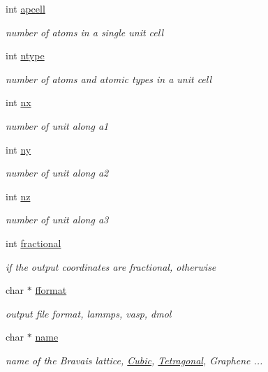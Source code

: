 \begin{DoxyCompactItemize}
int \hyperlink{class_l_a_t_t_i_c_e_acf531dce17fd666a58e9007615bc51eb}{apcell}
\begin{DoxyCompactList}\small\item\em number of atoms in a single unit cell \end{DoxyCompactList}\item 
int \hyperlink{class_l_a_t_t_i_c_e_a552cdb99c1b6cc2bd8bdd723e9f141ab}{ntype}
\begin{DoxyCompactList}\small\item\em number of atoms and atomic types in a unit cell \end{DoxyCompactList}\item 
int \hyperlink{class_l_a_t_t_i_c_e_a64884f89e993db7a215153bf5f56987b}{nx}
\begin{DoxyCompactList}\small\item\em number of unit along a1 \end{DoxyCompactList}\item 
int \hyperlink{class_l_a_t_t_i_c_e_aa202fceba51fcd040afafd1a02e2860e}{ny}
\begin{DoxyCompactList}\small\item\em number of unit along a2 \end{DoxyCompactList}\item 
int \hyperlink{class_l_a_t_t_i_c_e_ad32ea9361884a2bbcb81714ebe1bc15c}{nz}
\begin{DoxyCompactList}\small\item\em number of unit along a3 \end{DoxyCompactList}\item 
int \hyperlink{class_l_a_t_t_i_c_e_a922caeabeb80ebdc3c899b64eaf527ac}{fractional}
\begin{DoxyCompactList}\small\item\em {} if the output coordinates are fractional, {} otherwise \end{DoxyCompactList}\item 
char $\ast$ \hyperlink{class_l_a_t_t_i_c_e_ac1c63af3a896cf4d443347cd202698f7}{fformat}
\begin{DoxyCompactList}\small\item\em output file format, lammps, vasp, dmol \end{DoxyCompactList}\item 
char $\ast$ \hyperlink{class_l_a_t_t_i_c_e_ad986fd67c523ad7201ba9deaefcf6543}{name}
\begin{DoxyCompactList}\small\item\em name of the Bravais lattice, \hyperlink{class_cubic}{Cubic}, \hyperlink{class_tetragonal}{Tetragonal}, Graphene ... \end{DoxyCompactList}\item 

\end{DoxyCompactItemize}
